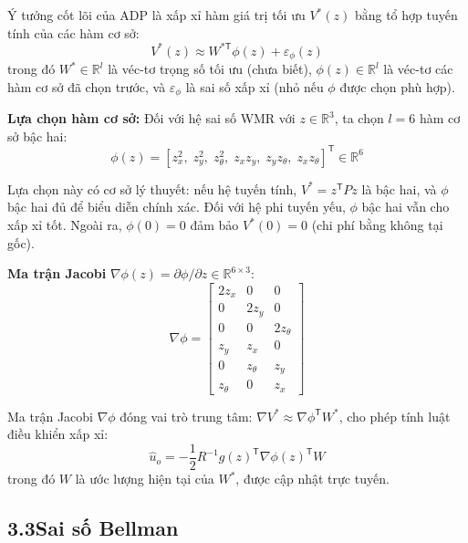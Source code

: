 \documentclass[12pt,a4paper]{article}
\newcommand{\R}{\mathbb{R}}
\newcommand{\T}{\mathsf{T}}
\begin{document}
Ý tưởng cốt lõi của ADP là xấp xỉ hàm giá trị tối ưu $V^*(z)$ bằng tổ hợp tuyến tính của các hàm cơ sở:
\begin{equation}\label{eq:approx_V}
    V^*(z) \approx W^{*\T} \phi(z) + \varepsilon_\phi(z)
\end{equation}
trong đó $W^* \in \R^l$ là véc-tơ trọng số tối ưu (chưa biết), $\phi(z) \in \R^l$ là véc-tơ các hàm cơ sở đã chọn trước, và $\varepsilon_\phi$ là sai số xấp xỉ (nhỏ nếu $\phi$ được chọn phù hợp).

\textbf{Lựa chọn hàm cơ sở:} Đối với hệ sai số WMR với $z \in \R^3$, ta chọn $l = 6$ hàm cơ sở bậc hai:
\begin{equation}\label{eq:basis}
    \phi(z) = [z_x^2,\; z_y^2,\; z_\theta^2,\; z_x z_y,\; z_y z_\theta,\; z_x z_\theta]^\T \in \R^6
\end{equation}

Lựa chọn này có cơ sở lý thuyết: nếu hệ tuyến tính, $V^* = z^\T Pz$ là bậc hai, và $\phi$ bậc hai đủ để biểu diễn chính xác. Đối với hệ phi tuyến yếu, $\phi$ bậc hai vẫn cho xấp xỉ tốt. Ngoài ra, $\phi(0) = 0$ đảm bảo $V^*(0) = 0$ (chi phí bằng không tại gốc).

\textbf{Ma trận Jacobi} $\nabla\phi(z) = \partial\phi/\partial z \in \R^{6 \times 3}$:
\begin{equation}\label{eq:nabla_phi}
    \nabla\phi = \begin{bmatrix}
        2z_x & 0 & 0 \\ 0 & 2z_y & 0 \\ 0 & 0 & 2z_\theta \\
        z_y & z_x & 0 \\ 0 & z_\theta & z_y \\ z_\theta & 0 & z_x
    \end{bmatrix}
\end{equation}

Ma trận Jacobi $\nabla\phi$ đóng vai trò trung tâm: $\nabla V^* \approx \nabla\phi^\T W^*$, cho phép tính luật điều khiển xấp xỉ:
\begin{equation}\label{eq:adp_control}
    \hat{u}_o = -\frac{1}{2} R^{-1} g(z)^\T \nabla\phi(z)^\T W
\end{equation}
trong đó $W$ là ước lượng hiện tại của $W^*$, được cập nhật trực tuyến.

\subsection*{3.3\quad Sai số Bellman}
\end{document}
